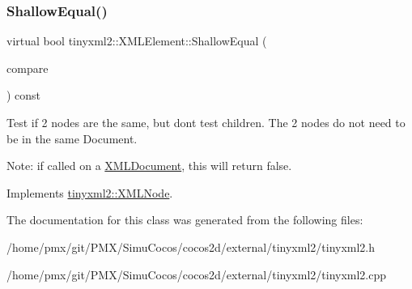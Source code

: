 \subsubsection{\texorpdfstring{Shallow\+Equal()}{ShallowEqual()}\hspace{0.1cm}{\footnotesize\ttfamily [2/2]}}
{\footnotesize\ttfamily virtual bool tinyxml2\+::\+X\+M\+L\+Element\+::\+Shallow\+Equal (\begin{DoxyParamCaption}\item[{const \hyperlink{classtinyxml2_1_1XMLNode}{X\+M\+L\+Node} $\ast$}]{compare }\end{DoxyParamCaption}) const\hspace{0.3cm}{\ttfamily [virtual]}}

Test if 2 nodes are the same, but don\textquotesingle{}t test children. The 2 nodes do not need to be in the same Document.

Note\+: if called on a \hyperlink{classtinyxml2_1_1XMLDocument}{X\+M\+L\+Document}, this will return false. 

Implements \hyperlink{classtinyxml2_1_1XMLNode_a7ce18b751c3ea09eac292dca264f9226}{tinyxml2\+::\+X\+M\+L\+Node}.



The documentation for this class was generated from the following files\+:\begin{DoxyCompactItemize}
\item 
/home/pmx/git/\+P\+M\+X/\+Simu\+Cocos/cocos2d/external/tinyxml2/tinyxml2.\+h\item 
/home/pmx/git/\+P\+M\+X/\+Simu\+Cocos/cocos2d/external/tinyxml2/tinyxml2.\+cpp\end{DoxyCompactItemize}

